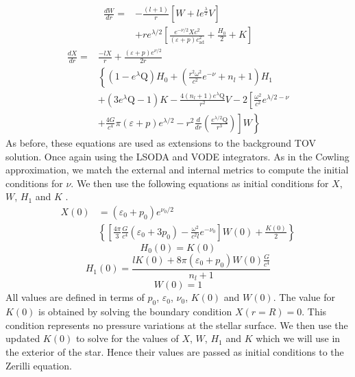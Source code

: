 \documentclass[aps,prd,twocolumn,superscriptaddress,footinbib]{revtex4-1}
\begin{document}
\begin{equation}
\begin{aligned}
\frac{d W}{d r}=&-\frac{(l+1)}{r}\left[W+l e^{\frac{\lambda}{2}} V\right] \\
&+re^{\lambda / 2}\left[\frac{e^{-\nu / 2} X c^2 }{(\varepsilon+p) c_{\mathrm{ad}}^{2}}+\frac{H_{0}}{2}+K\right]
\end{aligned}
\end{equation}
\begin{equation}
\begin{aligned}
\frac{d X}{d r}=&\frac{-l X}{r}+\frac{(\varepsilon+p) e^{\nu / 2}}{2r} \\
&\left\{\left(1-e^{\lambda} \mathrm{Q}\right) H_{0}+\left(\frac{r^{2} \omega^{2}}{c^2} e^{-\nu}+n_{l}+1\right) H_{1}\right.\\
&+\left(3 e^{\lambda} \mathrm{Q}-1\right) K-\frac{4\left(n_{l}+1\right) e^{\lambda} \mathrm{Q}}{r^{2}} V-2\left[\frac{\omega^{2}}{c^2} e^{\lambda / 2-\nu}\right.\\
&\left.\left.+\frac{4 G}{c^4} \pi(\varepsilon+p) e^{\lambda / 2}-r^{2} \frac{d}{d r}\left(\frac{e^{\lambda / 2} \mathrm{Q}}{r^{3}}\right)\right] W\right\}
\end{aligned}
\end{equation}
As before, these equations are used as extensions to the background TOV solution. Once again using the LSODA and VODE integrators. As in the Cowling approximation, we match the external and internal metrics to compute the initial conditions for $\nu$. We then use the following equations as initial conditions for $X$, $W$, $H_1$ and $K$ \cite{2205}. 
\begin{equation}
\begin{aligned}
X(0) &=\left(\varepsilon_{0}+p_{0}\right) e^{\nu_{0} / 2} \\
&\left\{\left[\frac{4 \pi}{3} \frac{G}{c^4} \left(\varepsilon_{0}+3 p_{0}\right)-\frac{\omega^{2}}{c^2 l} e^{-\nu_{0}}\right] W(0)+\frac{K(0)}{2}\right\}
\end{aligned}
\end{equation}
\begin{equation}
    H_0(0) = K(0)
\end{equation}
\begin{equation}
H_{1}(0)=\frac{l K(0)+8 \pi\left(\varepsilon_{0}+p_{0}\right) W(0)\frac{G}{c^4}}{n_{l}+1}
\end{equation}
\begin{equation}
W(0)=1
\end{equation}
All values are defined in terms of $p_0$, $\varepsilon_0$, $\nu_0$, $K(0)$ and $W(0)$. The value for $K(0)$ is obtained by solving the boundary condition $X(r=R)=0$. This condition represents no pressure variations at the stellar surface. We then use the updated $K(0)$ to solve for the values of $X$, $W$, $H_1$ and $K$ which we will use in the exterior of the star. Hence their values are passed as initial conditions to the Zerilli equation. 
\end{document}
